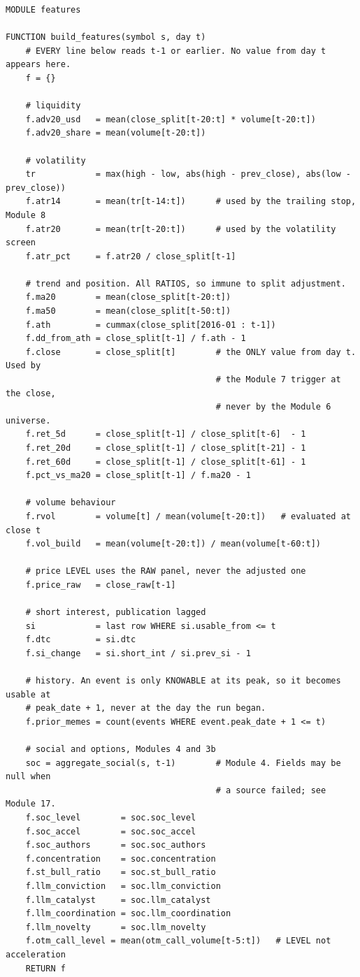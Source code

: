 \documentclass[10pt]{article}
\begin{document}
\begin{lstlisting}
MODULE features

FUNCTION build_features(symbol s, day t)
    # EVERY line below reads t-1 or earlier. No value from day t appears here.
    f = {}

    # liquidity
    f.adv20_usd   = mean(close_split[t-20:t] * volume[t-20:t])
    f.adv20_share = mean(volume[t-20:t])

    # volatility
    tr            = max(high - low, abs(high - prev_close), abs(low - prev_close))
    f.atr14       = mean(tr[t-14:t])      # used by the trailing stop, Module 8
    f.atr20       = mean(tr[t-20:t])      # used by the volatility screen
    f.atr_pct     = f.atr20 / close_split[t-1]

    # trend and position. All RATIOS, so immune to split adjustment.
    f.ma20        = mean(close_split[t-20:t])
    f.ma50        = mean(close_split[t-50:t])
    f.ath         = cummax(close_split[2016-01 : t-1])
    f.dd_from_ath = close_split[t-1] / f.ath - 1
    f.close       = close_split[t]        # the ONLY value from day t. Used by
                                          # the Module 7 trigger at the close,
                                          # never by the Module 6 universe.
    f.ret_5d      = close_split[t-1] / close_split[t-6]  - 1
    f.ret_20d     = close_split[t-1] / close_split[t-21] - 1
    f.ret_60d     = close_split[t-1] / close_split[t-61] - 1
    f.pct_vs_ma20 = close_split[t-1] / f.ma20 - 1

    # volume behaviour
    f.rvol        = volume[t] / mean(volume[t-20:t])   # evaluated at close t
    f.vol_build   = mean(volume[t-20:t]) / mean(volume[t-60:t])

    # price LEVEL uses the RAW panel, never the adjusted one
    f.price_raw   = close_raw[t-1]

    # short interest, publication lagged
    si            = last row WHERE si.usable_from <= t
    f.dtc         = si.dtc
    f.si_change   = si.short_int / si.prev_si - 1

    # history. An event is only KNOWABLE at its peak, so it becomes usable at
    # peak_date + 1, never at the day the run began.
    f.prior_memes = count(events WHERE event.peak_date + 1 <= t)

    # social and options, Modules 4 and 3b
    soc = aggregate_social(s, t-1)        # Module 4. Fields may be null when
                                          # a source failed; see Module 17.
    f.soc_level        = soc.soc_level
    f.soc_accel        = soc.soc_accel
    f.soc_authors      = soc.soc_authors
    f.concentration    = soc.concentration
    f.st_bull_ratio    = soc.st_bull_ratio
    f.llm_conviction   = soc.llm_conviction
    f.llm_catalyst     = soc.llm_catalyst
    f.llm_coordination = soc.llm_coordination
    f.llm_novelty      = soc.llm_novelty
    f.otm_call_level = mean(otm_call_volume[t-5:t])   # LEVEL not acceleration
    RETURN f



\end{lstlisting}
\end{document}
